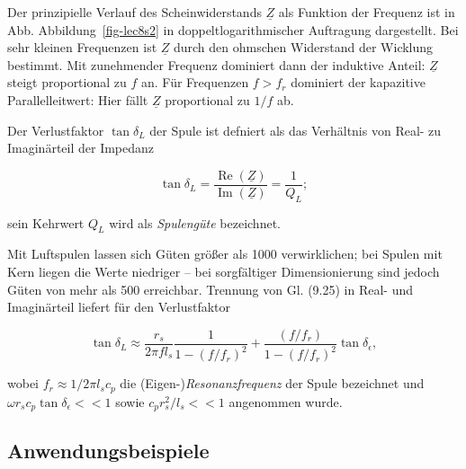 \documentclass[
  ngerman,
  letterpaper,
]{scrbook}
\begin{document}
Der prinzipielle Verlauf des Scheinwiderstands \(\underline{Z}\) als
Funktion der Frequenz ist in Abb. Abbildung~\ref{fig-lec8s2} in
doppeltlogarithmischer Auftragung dargestellt. Bei sehr kleinen
Frequenzen ist \(\underline{Z}\) durch den ohmschen Widerstand der
Wicklung bestimmt. Mit zunehmender Frequenz dominiert dann der induktive
Anteil: \(\underline{Z}\) steigt proportional zu \(f\) an. Für
Frequenzen \(f > f_r\) dominiert der kapazitive Parallelleitwert: Hier
fällt \(\underline{Z}\) proportional zu \(1/f\) ab.

\begin{tcolorbox}[enhanced jigsaw, titlerule=0mm, rightrule=.15mm, toprule=.15mm, colback=white, toptitle=1mm, bottomrule=.15mm, coltitle=black, leftrule=.75mm, arc=.35mm, colbacktitle=quarto-callout-note-color!10!white, opacityback=0, bottomtitle=1mm, colframe=quarto-callout-note-color-frame, opacitybacktitle=0.6, breakable, title=\textcolor{quarto-callout-note-color}{\faInfo}\hspace{0.5em}{Verlustfaktor, Spulengüte}, left=2mm]

Der Verlustfaktor \(\tan \delta_L\) der Spule ist defniert als das
Verhältnis von Real- zu Imaginärteil der Impedanz

\[
\tan \delta_L = \frac{\operatorname{Re}(\underline{Z})}{\operatorname{Im}(\underline{Z})} = \frac{1}{Q_L};
\]

sein Kehrwert \(Q_L\) wird als \emph{Spulengüte} bezeichnet.

\end{tcolorbox}

Mit Luftspulen lassen sich Güten größer als 1000 verwirklichen; bei
Spulen mit Kern liegen die Werte niedriger -- bei sorgfältiger
Dimensionierung sind jedoch Güten von mehr als 500 erreichbar. Trennung
von Gl. (9.25) in Real- und Imaginärteil liefert für den Verlustfaktor

\[
\tan \delta_L \approx \frac{r_s}{2 \pi f l_s} \frac{1}{1−(f/f_r)^2} + \frac{(f/f_r)}{1−(f/f_r)^2} \tan
\delta_{\epsilon},
\]

wobei \(f_r \approx 1 / 2 \pi l_s c_p\) die
(Eigen-)\emph{Resonanzfrequenz} der Spule bezeichnet und
\(\omega r_s c_p \tan \delta_{\epsilon} << 1\) sowie
\(c_p r_s^2/l_s << 1\) angenommen wurde.

\subsection{Anwendungsbeispiele}\label{anwendungsbeispiele}
\end{document}

